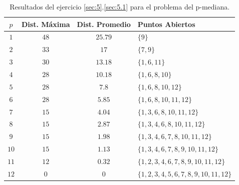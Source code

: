 \documentclass[spanish]{article}
\begin{document}
			\begin{table}[h]
				\begin{center}
					\begin{tabular}{|c || c || c || l | }
						\hline
						$p$		& Dist. Máxima 	& Dist. Promedio	& Puntos Abiertos	 \\ \hline \hline
						$1$ 	& $48$ 					& $25.79$					& $\{9\}$ \\ \hline
						$2$ 	& $33$ 					& $17$						& $\{7,9\}$ \\ \hline
						$3$ 	& $30$ 					& $13.18$					& $\{1,6,11\}$ \\ \hline
						$4$ 	& $28$ 					& $10.18$					& $\{1,6,8,10\}$ \\ \hline
						$5$ 	& $28$ 					& $7.8$						& $\{1,6,8,10,12\}$ \\ \hline
						$6$ 	& $28$ 					& $5.85$					& $\{1,6,8,10,11,12\}$ \\ \hline
						$7$ 	& $15$ 					& $4.04$					& $\{1,3,6,8,10,11,12\}$ \\ \hline
						$8$ 	& $15$ 					& $2.87$					& $\{1,3,4,6,8,10,11,12\}$ \\ \hline
						$9$ 	& $15$ 					& $1.98$					& $\{1,3,4,6,7,8,10,11,12\}$ \\ \hline
						$10$ 	& $15$ 					& $1.13$					& $\{1,3,4,6,7,8,9,10,11,12\}$ \\ \hline
						$11$ 	& $12$ 					& $0.32$					& $\{1,2,3,4,6,7,8,9,10,11,12\}$ \\ \hline
						$12$ 	& $0$ 					& $0$							& $\{1,2,3,4,5,6,7,8,9,10,11,12\}$ \\
						\hline
					\end{tabular}
				\end{center}
				\caption{Resultados del ejercicio \ref{sec:5}.\ref{sec:5.1} para el problema del p-mediana.}
				\label{table:sol-5.1median}
			\end{table}
\end{document}
